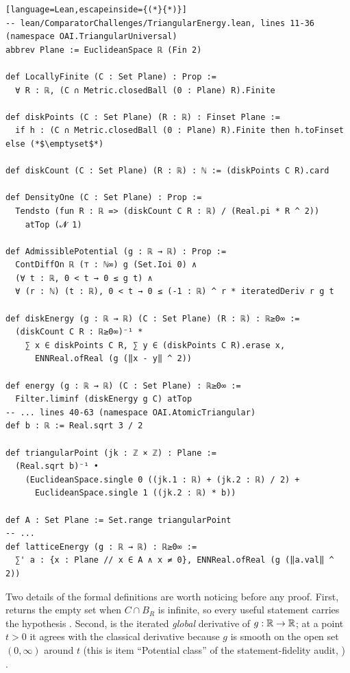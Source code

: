 \begin{leanbox}
\begin{lstlisting}[language=Lean,escapeinside={(*}{*)}]
-- lean/ComparatorChallenges/TriangularEnergy.lean, lines 11-36 (namespace OAI.TriangularUniversal)
abbrev Plane := EuclideanSpace ℝ (Fin 2)

def LocallyFinite (C : Set Plane) : Prop :=
  ∀ R : ℝ, (C ∩ Metric.closedBall (0 : Plane) R).Finite

def diskPoints (C : Set Plane) (R : ℝ) : Finset Plane :=
  if h : (C ∩ Metric.closedBall (0 : Plane) R).Finite then h.toFinset else (*$\emptyset$*)

def diskCount (C : Set Plane) (R : ℝ) : ℕ := (diskPoints C R).card

def DensityOne (C : Set Plane) : Prop :=
  Tendsto (fun R : ℝ => (diskCount C R : ℝ) / (Real.pi * R ^ 2))
    atTop (𝓝 1)

def AdmissiblePotential (g : ℝ → ℝ) : Prop :=
  ContDiffOn ℝ (⊤ : ℕ∞) g (Set.Ioi 0) ∧
  (∀ t : ℝ, 0 < t → 0 ≤ g t) ∧
  ∀ (r : ℕ) (t : ℝ), 0 < t → 0 ≤ (-1 : ℝ) ^ r * iteratedDeriv r g t

def diskEnergy (g : ℝ → ℝ) (C : Set Plane) (R : ℝ) : ℝ≥0∞ :=
  (diskCount C R : ℝ≥0∞)⁻¹ *
    ∑ x ∈ diskPoints C R, ∑ y ∈ (diskPoints C R).erase x,
      ENNReal.ofReal (g (‖x - y‖ ^ 2))

def energy (g : ℝ → ℝ) (C : Set Plane) : ℝ≥0∞ :=
  Filter.liminf (diskEnergy g C) atTop
-- ... lines 40-63 (namespace OAI.AtomicTriangular)
def b : ℝ := Real.sqrt 3 / 2

def triangularPoint (jk : ℤ × ℤ) : Plane :=
  (Real.sqrt b)⁻¹ •
    (EuclideanSpace.single 0 ((jk.1 : ℝ) + (jk.2 : ℝ) / 2) +
      EuclideanSpace.single 1 ((jk.2 : ℝ) * b))

def A : Set Plane := Set.range triangularPoint
-- ...
def latticeEnergy (g : ℝ → ℝ) : ℝ≥0∞ :=
  ∑' a : {x : Plane // x ∈ A ∧ x ≠ 0}, ENNReal.ofReal (g (‖a.val‖ ^ 2))
\end{lstlisting}
\end{leanbox}

Two details of the formal definitions are worth noticing before any proof. First,  returns the empty
set when $C\cap B_R$ is infinite, so every useful statement carries the hypothesis . Second,
 is the iterated \emph{global} derivative of $g:\mathbb{R}\to\mathbb{R}$; at a point $t>0$ it agrees with the
classical derivative because $g$ is smooth on the open set $(0,\infty)$ around $t$ (this is item ``Potential class'' of
the statement-fidelity audit, ) \tierC.


